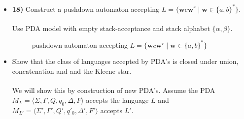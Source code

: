 \documentclass[defaultpackages]{simplereport}
\begin{document}
\begin{itemize}[label=]
  \item \textbf{18)} Construct a pushdown automaton accepting $L =
    \{\textbf{w}c\textbf{w}^r \mid \textbf{w} \in \{a, b\}^*\}$.\\\\
    Use PDA model with empty stack-acceptance and stack alphabet $\{\alpha, \beta\}$.
    \begin{figure}[H]
     \centering
     \caption{pushdown automaton accepting $L = \{\textbf{w}c\textbf{w}^r \mid \textbf{w} \in \{a, b\}^*\}$}
   \end{figure}
   
   \item Show that the class of languages accepted by PDA's is closed under
     union, concatenation and and the Kleene star.\\\\
     We will show this by construction of new PDA's. Assume the PDA $M_L =
     \langle \Sigma, \Gamma, Q, q_0, \Delta, F \rangle$ accepts the language $L$
     and $M_{L'} = \langle \Sigma', \Gamma', Q', q'_0, \Delta', F' \rangle$
     accepts $L'$.\\


\end{itemize}
\end{document}
